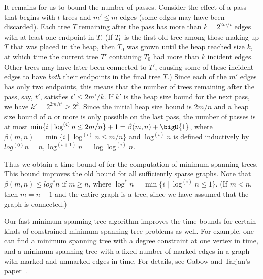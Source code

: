 It remains for us to bound the number of passes. Consider the effect of a pass that
begins with \(t\) trees and \(m' \leq m\) edges (some edges may have been discarded).
Each tree \(T\) remaining after the pass has more than \(k = 2^{2m/t}\) edges with at
least one endpoint in \(T\). (If \(T_0\) is the first old tree among those making up
\(T\) that was placed in the heap, then \(T_0\) was grown until the heap reached size
\(k\), at which time the current tree \(T'\) containing \(T_0\) had more than \(k\)
incident edges. Other trees may have later been connected to \(T'\), causing some of
these incident edges to have \emph{both} their endpoints in the final tree \(T\).)
Since each of the \(m'\) edges has only two endpoints, this means that the number of
trees remaining after the pass, say, \(t'\), satisfies \(t' \leq 2m'/k\). If \(k'\)
is the heap size bound for the next pass, we have \(k' = 2^{2m/t'} \geq 2^k\). Since
the initial heap size bound is \(2m/n\) and a heap size bound of \(n\) or more is
only possible on the last pass, the number of passes is at most \(\min \{ i \mid
\log^{(i)} n \leq 2m/n \} + 1 = \beta(m, n) + \bigO{1}\), where \(\beta(m, n) = \min
\{ i \mid \log^{(i)} n \leq m/n \}\) and \(\log^{(i)} n\) is defined inductively by
\(log^{(0)} n = n, \log^{(i+1)} n = \log \log^{(i)} n\).

Thus we obtain a time bound of  for the computation of minimum
spanning trees. This bound improves the old  bound
for all sufficiently sparse graphs. Note that \(\beta(m, n) \leq log^* n\) if \(m
\geq n\), where \(\log^* n = \min \{ i \mid \log^{(i)} n \leq 1 \}\). (If \(m < n\),
then \(m = n - 1\) and the entire graph is a tree, since we have assumed that the
graph is connected.)

Our fast minimum spanning tree algorithm improves the time bounds for certain kinds
of constrained minimum spanning tree problems as well. For example, one can find
a minimum spanning tree with a degree constraint at one vertex in  time, and a minimum spanning tree with a fixed number of marked edges in a graph
with marked and unmarked edges in  time. For details, see Gabow
and Tarjan's paper~\cite{GabowTarjan1984}.

